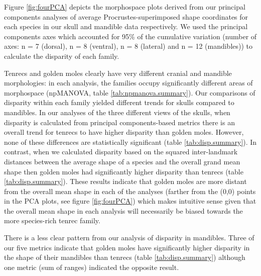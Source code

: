 \documentclass[12pt,a4paper]{article}
\begin{document}
	Figure  \ref{fig:fourPCA} depicts the morphospace plots derived from our principal components analyses of average Procrustes-superimposed shape coordinates for each species in our skull and mandible data respectively. We used the principal components axes which accounted for 95\% of the cumulative variation (number of axes: n = 7 (dorsal), n = 8 (ventral), n = 8 (lateral) and n = 12 (mandibles)) to calculate the disparity of each family. 

	Tenrecs and golden moles clearly have very different cranial and mandible morphologies: in each analysis, the families occupy significantly different areas of morphospace (npMANOVA, table \ref{tab:npmanova.summary}). Our comparisons of disparity within each family yielded different trends for skulls compared to mandibles. In our analyses of the three different views of the skulls, when disparity is calculated from principal components-based metrics there is an overall trend for tenrecs to have higher disparity than golden moles. However, none of these differences are statistically significant (table \ref{tab:disp.summary}). In contrast, when we calculated disparity based on the squared inter-landmark distances between the average shape of a species and the overall grand mean shape \citep{Zelditch2012} then golden moles had significantly higher disparity than tenrecs (table \ref{tab:disp.summary}). These results indicate that golden moles are more distant from the overall mean shape in each of the analyses (farther from the (0,0) points in the PCA plots, see figure \ref{fig:fourPCA}) which makes intuitive sense given that the overall mean shape in each analysis will necessarily be biased towards the more species-rich tenrec family. 

	

	
	There is a less clear pattern from our analysis of disparity in mandibles. Three of our five metrics indicate that golden moles have significantly higher disparity in the shape of their mandibles than tenrecs (table \ref{tab:disp.summary}) although one metric (sum of ranges) indicated the opposite result. 
	
\end{document}

